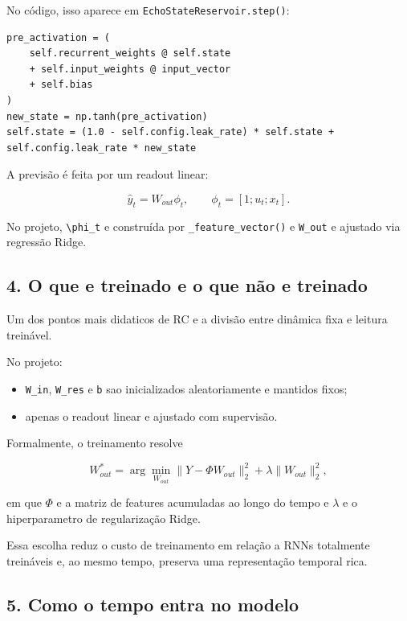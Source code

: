 \documentclass[12pt]{article}
\providecommand{\tightlist}{%
          \setlength{\itemsep}{0pt}\setlength{\parskip}{0pt}}
\begin{document}
No código, isso aparece em \texttt{EchoStateReservoir.step()}:

\begin{verbatim}
pre_activation = (
    self.recurrent_weights @ self.state
    + self.input_weights @ input_vector
    + self.bias
)
new_state = np.tanh(pre_activation)
self.state = (1.0 - self.config.leak_rate) * self.state + self.config.leak_rate * new_state
\end{verbatim}

A previsão é feita por um readout linear:

\[
\hat{y}_t = W_{out} \phi_t,
\qquad
\phi_t = [1; u_t; x_t].
\]

No projeto, \texttt{\textbackslash{}phi\_t} e construída por \texttt{\_feature\_vector()} e \texttt{W\_out} e ajustado via regressão Ridge.

\subsection{4. O que e treinado e o que não e treinado}\label{4-o-que-e-treinado-e-o-que-nuxe3o-e-treinado}

Um dos pontos mais didaticos de RC e a divisão entre dinâmica fixa e leitura treinável.

No projeto:

\begin{itemize}
\tightlist
\item
  \texttt{W\_in}, \texttt{W\_res} e \texttt{b} sao inicializados aleatoriamente e mantidos fixos;
\item
  apenas o readout linear e ajustado com supervisão.
\end{itemize}

Formalmente, o treinamento resolve

\[
W_{out}^* = \arg\min_{W_{out}}
\|Y - \Phi W_{out}\|_2^2 + \lambda \|W_{out}\|_2^2,
\]

em que \(\Phi\) e a matriz de features acumuladas ao longo do tempo e \(\lambda\) e o hiperparametro de regularização Ridge.

Essa escolha reduz o custo de treinamento em relação a RNNs totalmente treináveis e, ao mesmo tempo, preserva uma representação temporal rica.

\subsection{5. Como o tempo entra no modelo}\label{5-como-o-tempo-entra-no-modelo}
\end{document}
